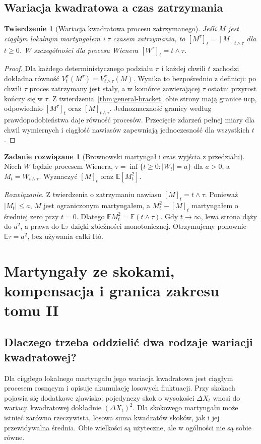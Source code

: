 \documentclass[11pt,a4paper,oneside]{report}
\numberwithin{equation}{chapter}
\theoremstyle{plain}
\newtheorem{twierdzenie}{Twierdzenie}[chapter]
\theoremstyle{definition}
\newtheorem{zadanie}{Zadanie rozwiązane}[chapter]
\theoremstyle{remark}
\newcommand{\E}{\mathbb{E}}
\begin{document}
\section{Wariacja kwadratowa a czas zatrzymania}
\begin{twierdzenie}[Wariacja kwadratowa procesu zatrzymanego]
Jeśli $M$ jest ciągłym lokalnym martyngałem i
$\tau$ czasem zatrzymania, to
$[M^\tau]_t=[M]_{t\wedge\tau}$ dla $t\ge0$.
W szczególności dla procesu Wienera
$[W^\tau]_t=t\wedge\tau$.
\end{twierdzenie}
\begin{proof}
Dla każdego deterministycznego podziału $\pi$ i każdej
chwili $t$ zachodzi dokładna równość
$V_t^\pi(M^\tau)=V_{t\wedge\tau}^\pi(M)$.
Wynika to bezpośrednio z definicji: po chwili $\tau$
proces zatrzymany jest stały, a w komórce zawierającej
$\tau$ ostatni przyrost kończy się w $\tau$.
Z twierdzenia~\ref{thm:general-bracket} obie strony
mają granice ucp, odpowiednio $[M^\tau]_t$ oraz
$[M]_{t\wedge\tau}$. Jednoznaczność granicy według
prawdopodobieństwa daje równość procesów.
Przecięcie zdarzeń pełnej miary dla chwil wymiernych
i ciągłość nawiasów zapewniają jednoczesność dla wszystkich $t$.
\end{proof}

\begin{zadanie}[Brownowski martyngał i czas wyjścia z przedziału]
Niech $W$ będzie procesem Wienera,
$\tau=\inf\{t\ge0:|W_t|=a\}$ dla $a>0$,
a $M_t=W_{t\wedge\tau}$.
Wyznaczyć $[M]_t$ oraz $\E[M_t^2]$.

\emph{Rozwiązanie.} Z twierdzenia o zatrzymaniu nawiasu
$[M]_t=t\wedge\tau$. Ponieważ $|M_t|\le a$,
$M$ jest ograniczonym martyngałem, a
$M_t^2-[M]_t$ martyngałem o średniej zero przy $t=0$.
Dlatego $\E M_t^2=\E(t\wedge\tau)$.
Gdy $t\to\infty$, lewa strona dąży do $a^2$,
a prawa do $\E\tau$ dzięki zbieżności monotonicznej.
Otrzymujemy ponownie $\E\tau=a^2$, bez używania
całki Itô.
\end{zadanie}


\chapter{Martyngały ze skokami, kompensacja i granica zakresu tomu II}
\label{ch:jump-mart}

\section{Dlaczego trzeba oddzielić dwa rodzaje wariacji kwadratowej?}
Dla ciągłego lokalnego martyngału jego wariacja kwadratowa
jest ciągłym procesem rosnącym i opisuje akumulację
losowych fluktuacji. Przy skokach pojawia się dodatkowe
zjawisko: pojedynczy skok o wysokości $\Delta X_t$
wnosi do wariacji kwadratowej dokładnie $(\Delta X_t)^2$.
Dla skokowego martyngału może istnieć zarówno rzeczywista,
losowa suma kwadratów skoków, jak i jej przewidywalna
średnia. Obie wielkości są użyteczne, ale w ogólności
nie są sobie równe.
\end{document}
